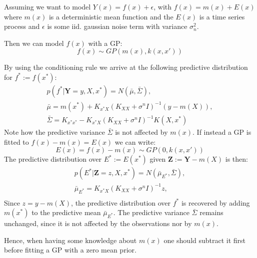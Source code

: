Assuming we want to model $Y(x) = f(x) + \epsilon$, with $f(x) = m(x) + E(x)$ where $m(x)$ is a deterministic mean function
and the $E(x)$ is a time series process and $\epsilon$ is some iid. gaussian noise term with variance $\sigma_n^{2}$.
%

Then we can model $f(x)$ with a GP:
$$ f(x) \sim GP(m(x), k(x,x'))$$

By using the conditioning rule we arrive at the following predictive distribution for $f^{\ast} := f(x^{\ast})$:
\begin{gather*}
    p(f^{\ast}| \mathbf{Y}= y, X, x^{\ast}) = N(\bar{\mu}, \bar{\Sigma}), \\
    \bar{\mu} = m(x^{\ast}) + K_{x^{\ast}X} (K_{XX} + \sigma^{n} I )^{-1}(y - m(X)),\\
    \bar{\Sigma} = K_{x^{\ast}x^{\ast}} - K_{x^{\ast}X} (K_{XX} + \sigma^{n} I )^{-1} K(X, x^{\ast})
\end{gather*}
Note how the predictive variance $\bar{\Sigma}$ is not affected by $m(x)$.
If instead a GP is fitted to $f(x) - m(x) = E(x)$ we can write:
$$ E(x) = f(x) - m(x) \sim GP(0, k(x,x'))$$
The predictive distribution over $E^{\ast} := E(x^{\ast})$ given $\mathbf{Z} := \mathbf{Y} - m(X)$ is then:
\begin{gather*}
    p(E^{\ast}| \mathbf{Z} = z, X, x^{\ast}) = N(\bar{\mu}_{E^{\ast}}, \bar{\Sigma}), \\
    \bar{\mu}_{E^{\ast}} = K_{x^{\ast}X} (K_{XX} + \sigma^{n} I )^{-1} z,\\
\end{gather*}
Since $ z = y - m(X)$, the predictive distribution over $f^{\ast}$ is recovered by adding $m(x^{\ast})$ to
the predictive mean $\bar{\mu}_{E^{\ast}}$. The predictive variance $\bar{\Sigma}$ remains unchanged,
since it is not affected by the observations nor by $m(x)$.

Hence, when
having some knowledge about $m(x)$ one should subtract it first before fitting a GP
with a zero mean prior.


